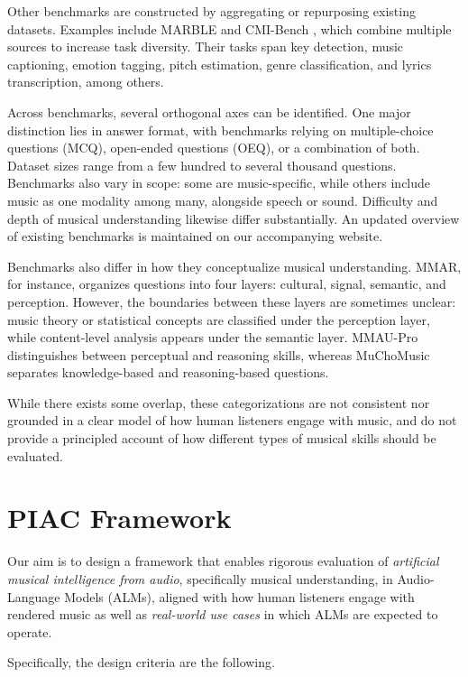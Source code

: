 \documentclass[conference,a4paper]{APSIPA2026}
\begin{document}
Other benchmarks are constructed by aggregating or repurposing existing datasets. Examples include MARBLE \cite{yuanMARBLEMusicAudio2023} and CMI-Bench \cite{maCMIBenchComprehensiveBenchmark2025}, which combine multiple sources to increase task diversity. Their tasks span key detection, music captioning, emotion tagging, pitch estimation, genre classification, and lyrics transcription, among others.

Across benchmarks, several orthogonal axes can be identified. One major distinction lies in answer format, with benchmarks relying on multiple-choice questions (MCQ), open-ended questions (OEQ), or a combination of both. Dataset sizes range from a few hundred to several thousand questions. Benchmarks also vary in scope: some are music-specific, while others include music as one modality among many, alongside speech or sound. Difficulty and depth of musical understanding likewise differ substantially. An updated overview of existing benchmarks is maintained on our accompanying website.

Benchmarks also differ in how they conceptualize musical understanding. MMAR, for instance, organizes questions into four layers: cultural, signal, semantic, and perception. However, the boundaries between these layers are sometimes unclear: music theory or statistical concepts are classified under the perception layer, while content-level analysis appears under the semantic layer. MMAU-Pro distinguishes between perceptual and reasoning skills, whereas MuChoMusic separates knowledge-based and reasoning-based questions.

While there exists some overlap, these categorizations are not consistent nor grounded in a clear model of how human listeners engage with music, and do not provide a principled account of how different types of musical skills should be evaluated.

\section{PIAC Framework}

Our aim is to design a framework that enables rigorous evaluation of \emph{artificial musical intelligence from audio}, specifically musical understanding, in Audio-Language Models (ALMs), aligned with how human listeners engage with rendered music as well as \emph{real-world use cases} in which ALMs are expected to operate.

Specifically, the design criteria are the following.
\end{document}
